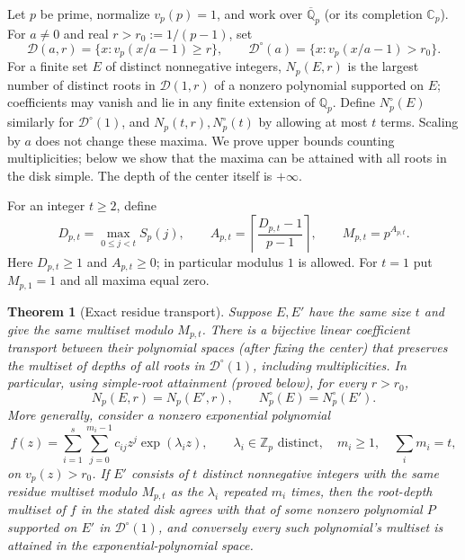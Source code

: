\documentclass[11pt]{article}
\newtheorem{theorem}{Theorem}[section]
\theoremstyle{remark}\newtheorem{remark}[theorem]{Remark}
\newcommand{\Q}{\mathbb Q}\newcommand{\Z}{\mathbb Z}\newcommand{\F}{\mathbb F}\newcommand{\C}{\mathbb C}
\newcommand{\vp}{v_p}\newcommand{\ord}{\operatorname{ord}}\newcommand{\spn}{\operatorname{span}}\newcommand{\res}{\operatorname{res}}
\newcommand{\D}{\mathcal D}\newcommand{\R}{\mathcal R}\newcommand{\Ocal}{\mathcal O}
\begin{document}
Let $p$ be prime, normalize $\vp(p)=1$, and work over $\overline{\Q}_p$ (or its completion
$\C_p$). For $a\ne0$ and real $r>r_0:=1/(p-1)$, set
\[
 \D(a,r)=\{x:\vp(x/a-1)\ge r\},\qquad
 \D^\circ(a)=\{x:\vp(x/a-1)>r_0\}.
\]
For a finite set $E$ of distinct nonnegative integers, $N_p(E,r)$ is the largest
number of distinct roots in $\D(1,r)$ of a nonzero polynomial supported on $E$;
coefficients may vanish and lie in any finite extension of $\Q_p$.
Define $N_p^\circ(E)$ similarly for $\D^\circ(1)$, and $N_p(t,r),N_p^\circ(t)$ by
allowing at most $t$ terms. Scaling by $a$ does not change these maxima. We prove
upper bounds counting multiplicities; below we show that the maxima can be attained
with all roots in the disk simple. The depth of the center itself is $+\infty$.

For an integer $t\ge2$, define
\begin{equation}\label{eq:precision}
 D_{p,t}=\max_{0\le j<t} S_p(j),\qquad
 A_{p,t}=\left\lceil\frac{D_{p,t}-1}{p-1}\right\rceil,\qquad M_{p,t}=p^{A_{p,t}}.
\end{equation}
Here $D_{p,t}\ge1$ and $A_{p,t}\ge0$; in particular modulus $1$ is allowed.
For $t=1$ put $M_{p,1}=1$ and all maxima equal zero.

\begin{theorem}[Exact residue transport]\label{thm:transport}
Suppose $E,E'$ have the same size $t$ and give the same multiset modulo $M_{p,t}$.
There is a bijective linear coefficient transport between their polynomial spaces
(after fixing the center) that preserves the multiset of depths of all roots in
$\D^\circ(1)$, including multiplicities. In particular, using simple-root attainment (proved below), for every $r>r_0$,
\[
 N_p(E,r)=N_p(E',r),\qquad N_p^\circ(E)=N_p^\circ(E').
\]
More generally, consider a nonzero exponential polynomial
\begin{equation}\label{eq:exp}
 f(z)=\sum_{i=1}^{s}\sum_{j=0}^{m_i-1} c_{ij}z^j\exp(\lambda_i z),\qquad
 \lambda_i\in\Z_p\text{ distinct},\quad m_i\ge1,\quad \sum_i m_i=t,
\end{equation}
on $\vp(z)>r_0$. If $E'$ consists of $t$ distinct nonnegative integers with the same
residue multiset modulo $M_{p,t}$ as the $\lambda_i$ repeated $m_i$ times, then the
root-depth multiset of $f$ in the stated disk agrees with that of some
nonzero polynomial $P$ supported on $E'$ in $\D^\circ(1)$, and conversely every such
polynomial's multiset is attained in the exponential-polynomial space.
\end{theorem}
\end{document}
